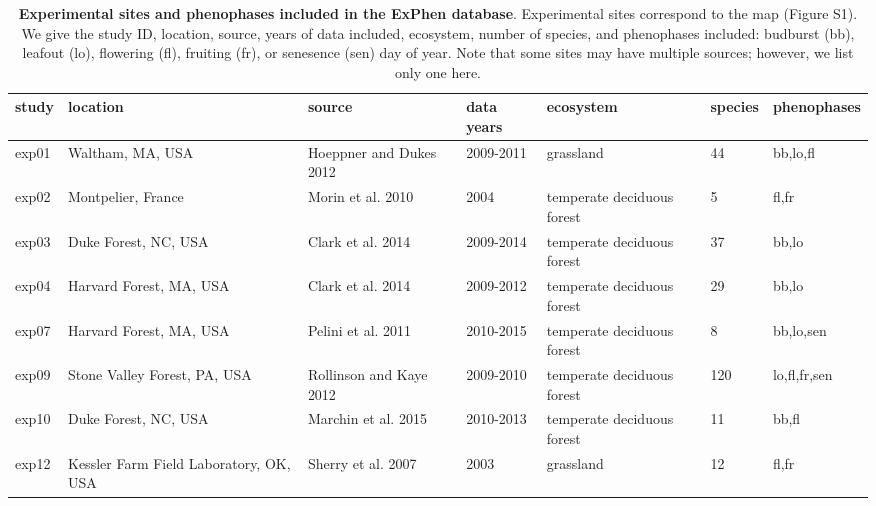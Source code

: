 \documentclass{article}
\begin{document}
\begin{table}[ht]
\centering
\caption{\textbf{Experimental sites and phenophases included in the ExPhen database}. Experimental sites correspond to the map (Figure S1). We give the study ID, location, source, years of data included, ecosystem, number of species, and phenophases included: budburst (bb), leafout (lo), flowering (fl), fruiting (fr), or senesence (sen) day of year. Note that some sites may have multiple sources; however, we list only one here.} 
\label{tab:studylocs}
\begingroup\footnotesize
\begin{tabular}{|p{}|p{}|p{}|p{}|p{}|p{}|p{}|}
  \hline
study & location & source & data years & ecosystem & species & phenophases \\ 
  \hline
exp01 & Waltham, MA, USA & Hoeppner and Dukes 2012 & 2009-2011 & grassland & 44 & bb,lo,fl \\ 
   \hline
exp02 & Montpelier, France & Morin et al. 2010 & 2004 & temperate deciduous forest & 5 & fl,fr \\ 
   \hline
exp03 & Duke Forest, NC, USA & Clark et al. 2014 & 2009-2014 & temperate deciduous forest & 37 & bb,lo \\ 
   \hline
exp04 & Harvard Forest, MA, USA & Clark et al. 2014 & 2009-2012 & temperate deciduous forest & 29 & bb,lo \\ 
   \hline
exp07 & Harvard Forest, MA, USA & Pelini et al. 2011 & 2010-2015 & temperate deciduous forest & 8 & bb,lo,sen \\ 
   \hline
exp09 & Stone Valley Forest, PA, USA & Rollinson and Kaye 2012 & 2009-2010 & temperate deciduous forest & 120 & lo,fl,fr,sen \\ 
   \hline
exp10 & Duke Forest, NC, USA & Marchin et al. 2015 & 2010-2013 & temperate deciduous forest & 11 & bb,fl \\ 
   \hline
exp12 & Kessler Farm Field Laboratory, OK, USA & Sherry et al. 2007 & 2003 & grassland & 12 & fl,fr \\ 
   \hline
\end{tabular}
\endgroup
\end{table}%

\clearpage
\end{document}
